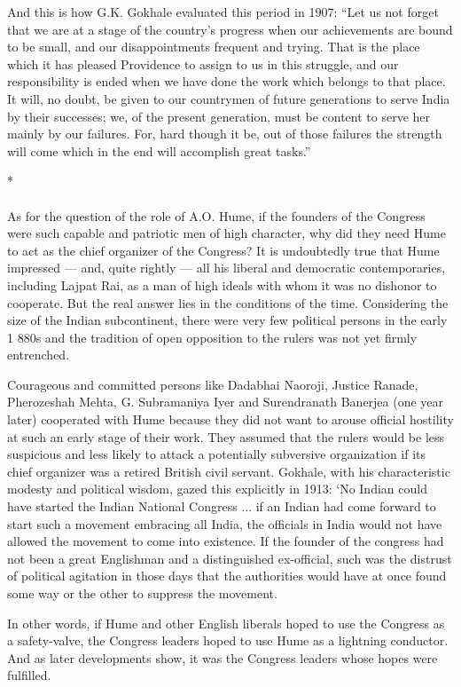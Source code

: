 And this is how G.K. Gokhale evaluated this period in 1907: ``Let us not forget that we are at a stage of the country's progress when our achievements are bound to be small, and our disappointments frequent and trying. That is the place which it has pleased Providence to assign to us in this struggle, and our responsibility is ended when we have done the work which belongs to that place. It will, no doubt, be given to our countrymen of future generations to serve India by their successes; we, of the present generation, must be content to serve her mainly by our failures. For, hard though it be, out of those failures the strength will come which in the end will accomplish great tasks.''

\begin{center}*\end{center}

\paragraph*{}

As for the question of the role of A.O. Hume, if the founders of the Congress were such capable and patriotic men of high character, why did they need Hume to act as the chief organizer of the Congress? It is undoubtedly true that Hume impressed --- and, quite rightly --- all his liberal and democratic contemporaries, including Lajpat Rai, as a man of high ideals with whom it was no dishonor to cooperate. But the real answer lies in the conditions of the time. Considering the size of the Indian subcontinent, there were very few political persons in the early 1 880s and the tradition of open opposition to the rulers was not yet firmly entrenched.

Courageous and committed persons like Dadabhai Naoroji, Justice Ranade, Pherozeshah Mehta, G. Subramaniya Iyer and Surendranath Banerjea (one year later) cooperated with Hume because they did not want to arouse official hostility at such an early stage of their work. They assumed that the rulers would be less suspicious and less likely to attack a potentially subversive organization if its chief organizer was a retired British civil servant. Gokhale, with his characteristic modesty and political wisdom, gazed this explicitly in 1913: `No Indian could have started the Indian National Congress ... if an Indian had come forward to start such a movement embracing all India, the officials in India would not have allowed the movement to come into existence. If the founder of the congress had not been a great Englishman and a distinguished ex-official, such was the distrust of political agitation in those days that the authorities would have at once found some way or the other to suppress the movement.

In other words, if Hume and other English liberals hoped to use the Congress as a safety-valve, the Congress leaders hoped to use Hume as a lightning conductor. And as later developments show, it was the Congress leaders whose hopes were fulfilled.
